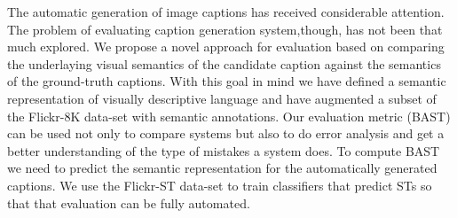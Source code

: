The automatic generation of image captions has received considerable attention. The problem of evaluating caption generation system,though, has not been that much explored. We propose a novel approach for evaluation based on comparing the underlaying visual semantics of the candidate caption against the semantics of the ground-truth captions. With this goal in mind we have defined a semantic representation of visually descriptive language and have augmented a subset of the Flickr-8K data-set with semantic annotations. Our evaluation metric (BAST) can be used not only to compare systems but also to do error analysis and get a better understanding of the type of mistakes a system does. To compute BAST we need to predict the semantic representation for the automatically generated captions. We use the Flickr-ST data-set to train classifiers that predict STs so that that evaluation can be fully automated.
